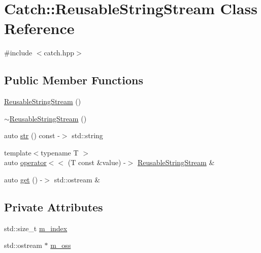 \hypertarget{class_catch_1_1_reusable_string_stream}{}\section{Catch\+::Reusable\+String\+Stream Class Reference}
\label{class_catch_1_1_reusable_string_stream}


{\ttfamily \#include $<$catch.\+hpp$>$}

\subsection*{Public Member Functions}
\begin{DoxyCompactItemize}
\item 
\mbox{\hyperlink{class_catch_1_1_reusable_string_stream_a9b3f8c52b0d2d63ffd825297a9c09781}{Reusable\+String\+Stream}} ()
\item 
\mbox{\hyperlink{class_catch_1_1_reusable_string_stream_aba9384e258a4db3178447b6a58414712}{$\sim$\+Reusable\+String\+Stream}} ()
\item 
auto \mbox{\hyperlink{class_catch_1_1_reusable_string_stream_a0e9ecf260b2a5d35f4886ef0d51f6270}{str}} () const -\/$>$ std\+::string
\item 
{\footnotesize template$<$typename T $>$ }\\auto \mbox{\hyperlink{class_catch_1_1_reusable_string_stream_af95f72024c082db70e5e50782e28e4f6}{operator$<$$<$}} (T const \&value) -\/$>$ \mbox{\hyperlink{class_catch_1_1_reusable_string_stream}{Reusable\+String\+Stream}} \&
\item 
auto \mbox{\hyperlink{class_catch_1_1_reusable_string_stream_a6881808c60a080d4e24a0b81c94cbf67}{get}} () -\/$>$ std\+::ostream \&
\end{DoxyCompactItemize}
\subsection*{Private Attributes}
\begin{DoxyCompactItemize}
\item 
std\+::size\+\_\+t \mbox{\hyperlink{class_catch_1_1_reusable_string_stream_a6e8154ffe67117de424c491e3b192504}{m\+\_\+index}}
\item 
std\+::ostream $\ast$ \mbox{\hyperlink{class_catch_1_1_reusable_string_stream_ae8dc0aa8ab418990869cd5ea9ee51f14}{m\+\_\+oss}}
\end{DoxyCompactItemize}


